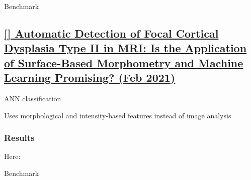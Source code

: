 \begin{table}[htbp]
	\centering
	\caption{Benchmark}

	\caption{Results from }%
	\label{tab:res13}
\end{table}

\newpage
\subsection{\href{https://www.frontiersin.org/journals/human-neuroscience/articles/10.3389/fnhum.2021.608285/full}{[] Automatic Detection of Focal Cortical Dysplasia Type II in MRI: Is the Application of Surface-Based Morphometry and Machine Learning Promising? (Feb 2021)}}
\label{res14}

ANN classification

Uses morphological and intensity-based features instead of image analysis

\subsubsection{Results}

Here: 

\begin{table}[htbp]
	\centering
	\caption{Benchmark}

	\caption{Results from }%
	\label{tab:res14}
\end{table}

